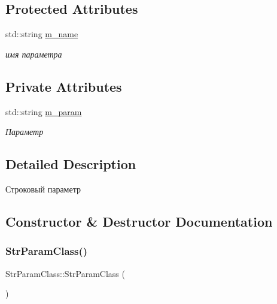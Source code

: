 \subsection*{Protected Attributes}
\begin{DoxyCompactItemize}
\item 
std\+::string \hyperlink{class_set_param_class_aab204889210304af482b414a6f8dbe82}{m\+\_\+name}
\begin{DoxyCompactList}\small\item\em имя параметра \end{DoxyCompactList}\end{DoxyCompactItemize}
\subsection*{Private Attributes}
\begin{DoxyCompactItemize}
\item 
std\+::string \hyperlink{class_str_param_class_a1c67ba23761c9eb69383b0e104562a96}{m\+\_\+param}
\begin{DoxyCompactList}\small\item\em Параметр \end{DoxyCompactList}\end{DoxyCompactItemize}


\subsection{Detailed Description}
Строковый параметр 

\subsection{Constructor \& Destructor Documentation}
\mbox{\label{class_str_param_class_a2c16d67151ee547c239cd6eaf6b05d9f}} 
\subsubsection{\texorpdfstring{Str\+Param\+Class()}{StrParamClass()}\hspace{0.1cm}{\footnotesize\ttfamily [1/2]}}
{\footnotesize\ttfamily Str\+Param\+Class\+::\+Str\+Param\+Class (\begin{DoxyParamCaption}{ }\end{DoxyParamCaption})}

